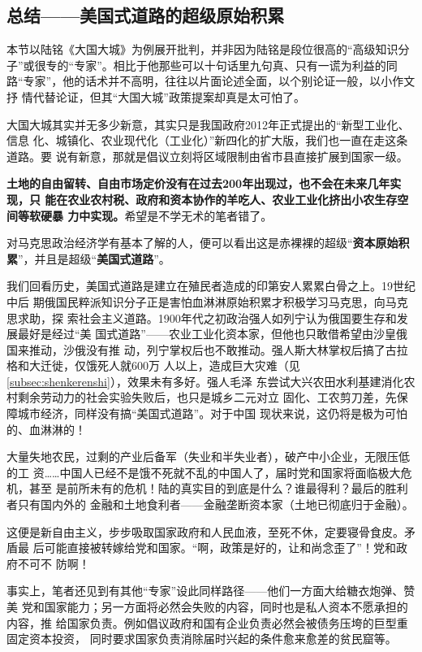 \subsection{总结——美国式道路的超级原始积累}


本节以陆铭《大国大城》为例展开批判，并非因为陆铭是段位很高的“高级知识分
子”或很专的“专家”。相比于他那些可以十句话里九句真、只有一谎为利益的同
路“专家”，他的话术并不高明，往往以片面论述全面，以个别论证一般，以小作文抒
情代替论证，但其“大国大城”政策提案却真是太可怕了。

大国大城其实并无多少新意，其实只是我国政府2012年正式提出的“新型工业化、信息
化、城镇化、农业现代化（工业化）”新四化的扩大版，我们也一直在走这条道路。要
说有新意，那就是倡议立刻将区域限制由省市县直接扩展到国家一级。

\textbf{土地的自由留转、自由市场定价没有在过去200年出现过，也不会在未来几年实现，只
  能在农业农村税、政府和资本协作的羊吃人、农业工业化挤出小农生存空间等软硬暴
  力中实现。}希望是不学无术的笔者错了。

对马克思政治经济学有基本了解的人，便可以看出这是赤裸裸的超级“\textbf{资本原始积
累}”，并且是超级“\textbf{美国式道路}”。

我们回看历史，美国式道路是建立在殖民者造成的印第安人累累白骨之上。19世纪中后
期俄国民粹派知识分子正是害怕血淋淋原始积累才积极学习马克思，向马克思求助，探
索社会主义道路。1900年代之初政治强人如列宁认为俄国要生存和发展最好是经过“美
国式道路”——农业工业化资本家，但他也只敢借希望由沙皇俄国来推动，沙俄没有推
动，列宁掌权后也不敢推动。强人斯大林掌权后搞了古拉格和大迁徙，仅饿死人就600万
人以上，造成巨大灾难（见\cref{subsec:shenkerenshi}），效果未有多好。强人毛泽
东尝试大兴农田水利基建消化农村剩余劳动力的社会实验失败后，也只是城乡二元对立
固化、工农剪刀差，先保障城市经济，同样没有搞“美国式道路”。对于中国
现状来说，这仍将是极为可怕的、血淋淋的！

大量失地农民，过剩的产业后备军（失业和半失业者），破产中小企业，无限压低的工
资……中国人已经不是饿不死就不乱的中国人了，届时党和国家将面临极大危机，甚至
是前所未有的危机！陆的真实目的到底是什么？谁最得利？最后的胜利者只有国内外的
金融和土地食利者——金融垄断资本家（土地已彻底归于金融）。

这便是新自由主义，步步吸取国家政府和人民血液，至死不休，定要寝骨食皮。矛盾最
后可能直接被转嫁给党和国家。“啊，政策是好的，让和尚念歪了”！党和政府不可不
防啊！

事实上，笔者还见到有其他“专家”设此同样路径——他们一方面大给糖衣炮弹、赞美
党和国家能力；另一方面将必然会失败的内容，同时也是私人资本不愿承担的内容，推
给国家负责。例如倡议政府和国有企业负责必然会被债务压垮的巨型重固定资本投资，
同时要求国家负责消除届时兴起的条件愈来愈差的贫民窟等。

